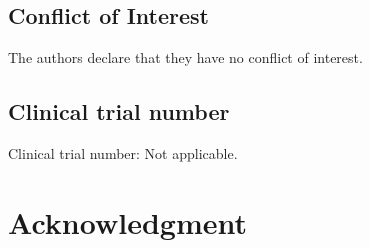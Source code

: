 \documentclass[authoryear,final,5p,times,twocolumn]{elsarticle}
\theoremstyle{plain}
\begin{document}
\subsection{Conflict of Interest}
The authors declare that they have no conflict of interest.

\subsection{Clinical trial number}
Clinical trial number: Not applicable.

\section{Acknowledgment}
\end{document}
